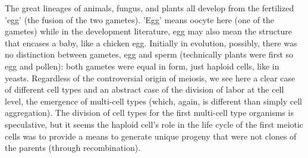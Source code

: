 The great lineages of animals, fungus, and plants all develop from the fertilized 'egg' (the fusion of the two gametes).  'Egg' means oocyte here (one of the gametes) while in the development literature, egg may also mean the structure that encases a baby, like a chicken egg.  Initially in evolution, possibly, there was no distinction between gametes, egg and sperm (technically plants were first so egg and pollen): both gametes were equal in form, just haploid cells, like in yeasts.  Regardless of the controversial origin of meiosis, we see here a clear case of different cell types and an abstract case of the division of labor at the cell level, the emergence of multi-cell types (which, again, is different than simply cell aggregation).  The division of cell types for the first multi-cell type organisms is speculative, but it seems the haploid cell's role in the life cycle of the first meiotic cells was to provide a means to generate unique progeny that were not clones of the parents (through recombination).   

